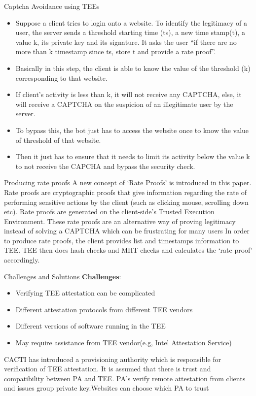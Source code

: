 \documentclass{beamer}
\begin{document}
\begin{frame}{Captcha Avoidance using TEEs}
	\begin{itemize}
	\item Suppose a client tries to login onto a website. To identify the legitimacy of a user, the server sends a threshold starting time (ts), a new time stamp(t), a value k, its private key and its signature. It asks the user “if there are no more than k timestamp since ts, store t and provide a rate proof”.
	\item Basically in this step, the client is able to know the value of the threshold (k) corresponding to that website.
	\item If client’s activity is less than k, it will not receive any CAPTCHA, else, it will receive a CAPTCHA on the suspicion of an illegitimate user by the server.
	\item To bypass this, the bot just has to access the website once to know the value of threshold of that website.
	\item Then it just has to ensure that it needs to limit its activity below the value k to not receive the CAPCHA and bypass the security check.
	\end{itemize}
\end{frame}

\begin{frame}{Producing rate proofs}
	A new concept of ‘Rate Proofs’ is introduced in this paper. Rate proofs are cryptographic proofs that give information regarding the rate of performing sensitive actions by the client (such as clicking mouse, scrolling down etc). Rate proofs are generated on the client-side's Trusted Execution Environment. These rate proofs are an alternative way of proving legitimacy instead of solving a CAPTCHA which can be frustrating for many users In order to produce rate proofs, the client provides list and timestamps information to TEE. TEE then does hash checks and MHT checks and calculates the ‘rate proof’ accordingly.
\end{frame}

\begin{frame}{Challenges and Solutions}
	\textbf{Challenges}:
	\begin{itemize}
		\item Verifying TEE attestation can be complicated
		\item Different attestation protocols from different TEE vendors
		\item Different versions of software running in the TEE
		\item May require assistance from TEE vendor(e.g, Intel Attestation Service)
	\end{itemize}

	CACTI has  introduced a provisioning authority which is responsible for verification of TEE attestation. It is assumed that there is trust and compatibility between PA and TEE. PA’s verify remote attestation from clients and issues group private key.Websites can choose which PA to trust

\end{frame}
\end{document}

